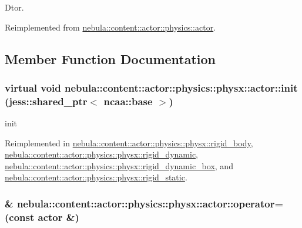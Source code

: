 Dtor. 

Reimplemented from \hyperlink{classnebula_1_1content_1_1actor_1_1physics_1_1actor_ab55f739894c43f00ba9b60b0a54c12be}{nebula::content::actor::physics::actor}.

\subsection{Member Function Documentation}
\hypertarget{classnebula_1_1content_1_1actor_1_1physics_1_1physx_1_1actor_a8785949a5e49754d32cdd14c447b4b5c}{
\subsubsection[{init}]{\setlength{\rightskip}{0pt plus 5cm}virtual void nebula::content::actor::physics::physx::actor::init (jess::shared\_\-ptr$<$ {\bf ncaa::base} $>$)}}
\label{classnebula_1_1content_1_1actor_1_1physics_1_1physx_1_1actor_a8785949a5e49754d32cdd14c447b4b5c}


init 

Reimplemented in \hyperlink{classnebula_1_1content_1_1actor_1_1physics_1_1physx_1_1rigid__body_ab8c6ec84944227e76530c1b378ca2e80}{nebula::content::actor::physics::physx::rigid\_\-body}, \hyperlink{classnebula_1_1content_1_1actor_1_1physics_1_1physx_1_1rigid__dynamic_aa1a7a01fdaf7260bc9f631fc0bb3a4ad}{nebula::content::actor::physics::physx::rigid\_\-dynamic}, \hyperlink{classnebula_1_1content_1_1actor_1_1physics_1_1physx_1_1rigid__dynamic__box_a380f48572e81f3dc2ac5f2345b173967}{nebula::content::actor::physics::physx::rigid\_\-dynamic\_\-box}, and \hyperlink{classnebula_1_1content_1_1actor_1_1physics_1_1physx_1_1rigid__static_a2306b7296339f9db69ff723fd296b36d}{nebula::content::actor::physics::physx::rigid\_\-static}.\hypertarget{classnebula_1_1content_1_1actor_1_1physics_1_1physx_1_1actor_a2eb5926a96bcef37981ad9fcb55d35e4}{
\subsubsection[{operator=}]{\& nebula::content::actor::physics::physx::actor::operator= (const {\bf actor} \&)}}
\label{classnebula_1_1content_1_1actor_1_1physics_1_1physx_1_1actor_a2eb5926a96bcef37981ad9fcb55d35e4}


